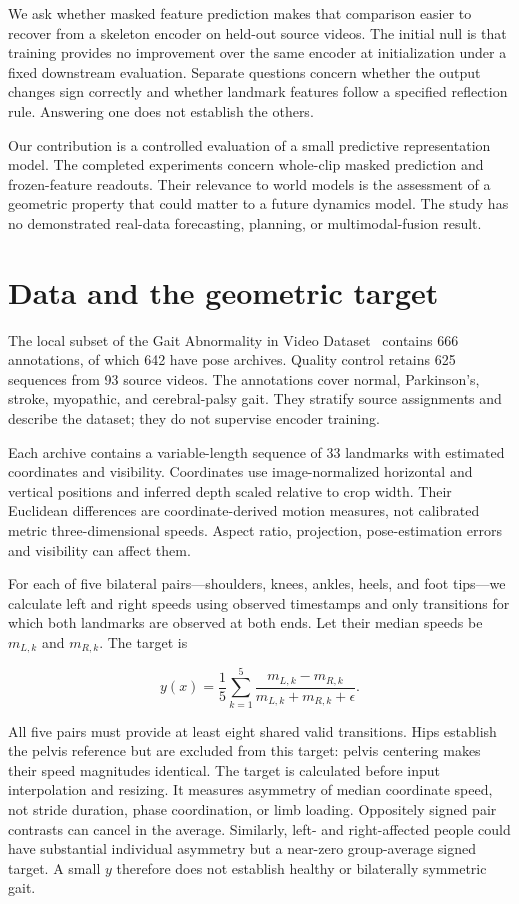 \documentclass{article}
\begin{document}
We ask whether masked feature prediction makes that comparison easier to recover from a skeleton encoder on held-out source videos. The initial null is that training provides no improvement over the same encoder at initialization under a fixed downstream evaluation. Separate questions concern whether the output changes sign correctly and whether landmark features follow a specified reflection rule. Answering one does not establish the others.

Our contribution is a controlled evaluation of a small predictive representation model. The completed experiments concern whole-clip masked prediction and frozen-feature readouts. Their relevance to world models is the assessment of a geometric property that could matter to a future dynamics model. The study has no demonstrated real-data forecasting, planning, or multimodal-fusion result.

\section{Data and the geometric target}\label{data-and-the-geometric-target}

The local subset of the Gait Abnormality in Video Dataset~\citep{ref06} contains 666 annotations, of which 642 have pose archives. Quality control retains 625 sequences from 93 source videos. The annotations cover normal, Parkinson's, stroke, myopathic, and cerebral-palsy gait. They stratify source assignments and describe the dataset; they do not supervise encoder training.

Each archive contains a variable-length sequence of 33 landmarks with estimated coordinates and visibility. Coordinates use image-normalized horizontal and vertical positions and inferred depth scaled relative to crop width. Their Euclidean differences are coordinate-derived motion measures, not calibrated metric three-dimensional speeds. Aspect ratio, projection, pose-estimation errors and visibility can affect them.

For each of five bilateral pairs---shoulders, knees, ankles, heels, and foot tips---we calculate left and right speeds using observed timestamps and only transitions for which both landmarks are observed at both ends. Let their median speeds be \(m_{L,k}\) and \(m_{R,k}\). The target is

\[
y(x)=\frac{1}{5}\sum_{k=1}^{5}
\frac{m_{L,k}-m_{R,k}}{m_{L,k}+m_{R,k}+\epsilon}.
\]

All five pairs must provide at least eight shared valid transitions. Hips establish the pelvis reference but are excluded from this target: pelvis centering makes their speed magnitudes identical. The target is calculated before input interpolation and resizing. It measures asymmetry of median coordinate speed, not stride duration, phase coordination, or limb loading. Oppositely signed pair contrasts can cancel in the average. Similarly, left- and right-affected people could have substantial individual asymmetry but a near-zero group-average signed target. A small \(y\) therefore does not establish healthy or bilaterally symmetric gait.
\end{document}
